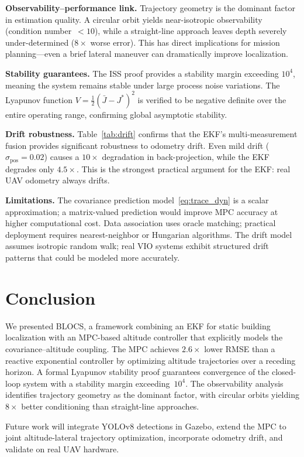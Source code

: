 \documentclass[journal]{IEEEtran}
\begin{document}
\textbf{Observability--performance link.}
Trajectory geometry is the dominant factor in estimation quality.
A circular orbit yields near-isotropic observability (condition number~$<10$), while a straight-line approach leaves depth severely under-determined ($8\times$ worse error).
This has direct implications for mission planning---even a brief lateral maneuver can dramatically improve localization.

\textbf{Stability guarantees.}
The ISS proof provides a stability margin exceeding $10^4$, meaning the system remains stable under large process noise variations.
The Lyapunov function $V = \frac{1}{2}(\bar{J} - J^*)^2$ is verified to be negative definite over the entire operating range, confirming global asymptotic stability.

\textbf{Drift robustness.}
Table~\ref{tab:drift} confirms that the EKF's multi-measurement fusion provides significant robustness to odometry drift.
Even mild drift ($\sigma_{\text{pos}} = 0.02$) causes a $10\times$ degradation in back-projection, while the EKF degrades only $4.5\times$.
This is the strongest practical argument for the EKF: real UAV odometry always drifts.

\textbf{Limitations.}
The covariance prediction model~\eqref{eq:trace_dyn} is a scalar approximation; a matrix-valued prediction would improve MPC accuracy at higher computational cost.
Data association uses oracle matching; practical deployment requires nearest-neighbor or Hungarian algorithms.
The drift model assumes isotropic random walk; real VIO systems exhibit structured drift patterns that could be modeled more accurately.

\section{Conclusion}

We presented BLOCS, a framework combining an EKF for static building localization with an MPC-based altitude controller that explicitly models the covariance--altitude coupling.
The MPC achieves $2.6\times$ lower RMSE than a reactive exponential controller by optimizing altitude trajectories over a receding horizon.
A formal Lyapunov stability proof guarantees convergence of the closed-loop system with a stability margin exceeding~$10^4$.
The observability analysis identifies trajectory geometry as the dominant factor, with circular orbits yielding $8\times$ better conditioning than straight-line approaches.

Future work will integrate YOLOv8 detections in Gazebo, extend the MPC to joint altitude-lateral trajectory optimization, incorporate odometry drift, and validate on real UAV hardware.




\end{document}
